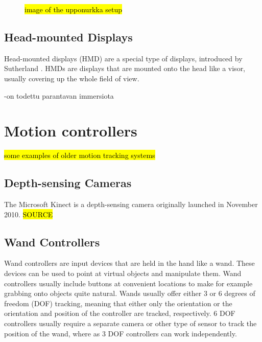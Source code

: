 \documentclass[12pt,a4paper,oneside,pdftex]{report}
\begin{document}
\begin{figure}
\label{figure:upponurkka}
\hl{image of the upponurkka setup}
\end{figure}

\subsection{Head-mounted Displays}
\label{subsection:displayenvironments:hmd}

Head-mounted displays (HMD) are a special type of displays, introduced by Sutherland \cite{SutherlandHMD}. HMDs are displays that are mounted onto the head like a visor, usually covering up the whole field of view.

-on todettu parantavan immersiota \cite{PauschQuantifyingImmersion}

\section{Motion controllers}
\label{section:motioncontrollers}

\hl{some examples of older motion tracking systems}


\subsection{Depth-sensing Cameras}
\label{subsection:motion:kinect}

The Microsoft Kinect is a depth-sensing camera originally launched in November 2010. \hl{SOURCE}

\subsection{Wand Controllers}
\label{subsection:motion:move}

Wand controllers are input devices that are held in the hand like a wand. These devices can be used to point at virtual objects and manipulate them. Wand controllers usually include buttons at convenient locations to make for example grabbing onto objects quite natural. Wands usually offer either 3 or 6 degrees of freedom (DOF) tracking, meaning that either only the orientation or the orientation and position of the controller are tracked, respectively. 6 DOF controllers usually require a separate camera or other type of sensor to track the position of the wand, where as 3 DOF controllers can work independently.
\end{document}
